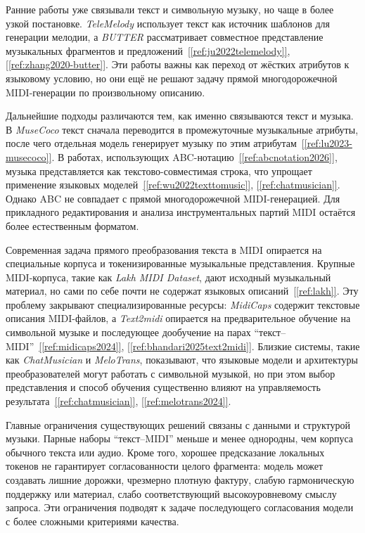 \documentclass[a4paper,12pt]{extarticle}
\newcommand{\sourcecite}[1]{\hyperref[#1]{[\ref*{#1}]}}
\begin{document}
Ранние работы уже связывали текст и символьную музыку, но чаще в более
узкой постановке. \textit{TeleMelody} использует текст как источник
шаблонов для генерации мелодии, а \textit{BUTTER} рассматривает совместное
представление музыкальных фрагментов и предложений~\sourcecite{ref:ju2022telemelody}, \sourcecite{ref:zhang2020-butter}. Эти работы важны как переход от
жёстких атрибутов к языковому условию, но они ещё не решают задачу прямой
многодорожечной MIDI-генерации по произвольному описанию.

Дальнейшие подходы различаются тем, как именно связываются текст и музыка.
В \textit{MuseCoco} текст сначала переводится в промежуточные музыкальные
атрибуты, после чего отдельная модель генерирует музыку по этим атрибутам~\sourcecite{ref:lu2023-musecoco}. В работах, использующих ABC-нотацию~\sourcecite{ref:abcnotation2026}, музыка
представляется как текстово-совместимая строка, что упрощает применение
языковых моделей~\sourcecite{ref:wu2022texttomusic}, \sourcecite{ref:chatmusician}. Однако ABC
не совпадает с прямой многодорожечной MIDI-генерацией. Для прикладного
редактирования и анализа инструментальных партий MIDI остаётся более
естественным форматом.

Современная задача прямого преобразования текста в MIDI опирается на
специальные корпуса и токенизированные музыкальные представления. Крупные
MIDI-корпуса, такие как \textit{Lakh MIDI Dataset}, дают исходный
музыкальный материал, но сами по себе почти не содержат языковых описаний~\sourcecite{ref:lakh}. Эту проблему закрывают специализированные ресурсы:
\textit{MidiCaps} содержит текстовые описания MIDI-файлов, а
\textit{Text2midi} опирается на предварительное обучение на символьной
музыке и последующее дообучение на парах ``текст--MIDI''~\sourcecite{ref:midicaps2024}, \sourcecite{ref:bhandari2025text2midi}. Близкие системы, такие как
\textit{ChatMusician} и \textit{MeloTrans}, показывают, что языковые модели
и архитектуры преобразователей могут работать с символьной музыкой, но при
этом выбор представления и способ обучения существенно влияют на
управляемость результата~\sourcecite{ref:chatmusician}, \sourcecite{ref:melotrans2024}.

Главные ограничения существующих решений связаны с данными и структурой
музыки. Парные наборы ``текст--MIDI'' меньше и менее однородны, чем корпуса
обычного текста или аудио. Кроме того, хорошее предсказание локальных токенов
не гарантирует согласованности целого фрагмента: модель может создавать
лишние дорожки, чрезмерно плотную фактуру, слабую гармоническую поддержку
или материал, слабо соответствующий высокоуровневому смыслу запроса. Эти
ограничения подводят к задаче последующего согласования модели с более
сложными критериями качества.
\end{document}
